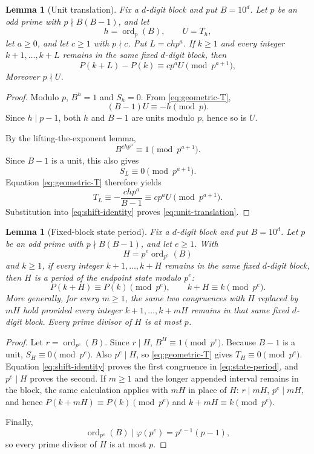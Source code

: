 \documentclass[11pt]{amsart}
\newtheorem{lemma}[theorem]{Lemma}
\theoremstyle{remark}
\newcommand{\ord}{\operatorname{ord}}
\begin{document}
\begin{lemma}[Unit translation]\label{lem:unit-translation}
Fix a \(d\)-digit block and put \(B=10^d\).  Let \(p\) be an odd prime with
\(p\nmid B(B-1)\), and let
\[
h=\ord_p(B),
\qquad
U=T_h,
\]
let \(a\ge0\), and let \(c\ge1\) with \(p\nmid c\).  Put \(L=chp^a\).  If
\(k\ge1\) and every integer \(k+1,\ldots,k+L\) remains in the same fixed
\(d\)-digit block, then
\begin{equation}\label{eq:unit-translation}
P(k+L)-P(k)\equiv cp^aU\pmod{p^{a+1}},
\end{equation}
Moreover \(p\nmid U\).
\end{lemma}

\begin{proof}
Modulo \(p\), \(B^h=1\) and \(S_h=0\).  From \eqref{eq:geometric-T},
\[
(B-1)U\equiv-h\pmod p.
\]
Since \(h\mid p-1\), both \(h\) and \(B-1\) are units modulo \(p\), hence so is \(U\).

By the lifting-the-exponent lemma,
\[
B^{chp^a}\equiv1\pmod{p^{a+1}}.
\]
Since \(B-1\) is a unit, this also gives
\[
S_L\equiv0\pmod{p^{a+1}}.
\]
Equation \eqref{eq:geometric-T} therefore yields
\[
T_L\equiv-\frac{chp^a}{B-1}\equiv cp^aU
\pmod{p^{a+1}}.
\]
Substitution into \eqref{eq:shift-identity} proves \eqref{eq:unit-translation}.
\end{proof}

\begin{lemma}[Fixed-block state period]\label{lem:state-period}
Fix a \(d\)-digit block and put \(B=10^d\).  Let \(p\) be an odd prime with
\(p\nmid B(B-1)\), and let \(e\ge1\).  With
\begin{equation}\label{eq:state-period-length}
H=p^e\ord_{p^e}(B)
\end{equation}
and \(k\ge1\), if every integer \(k+1,\ldots,k+H\) remains in the same fixed
\(d\)-digit block, then \(H\) is a period of the endpoint state modulo \(p^e\):
\begin{equation}\label{eq:state-period}
P(k+H)\equiv P(k)\pmod{p^e},
\qquad
k+H\equiv k\pmod{p^e}.
\end{equation}
More generally, for every \(m\ge1\), the same two congruences with \(H\) replaced
by \(mH\) hold provided every integer \(k+1,\ldots,k+mH\) remains in that same
fixed \(d\)-digit block.  Every prime divisor of \(H\) is at most \(p\).
\end{lemma}

\begin{proof}
Let \(r=\ord_{p^e}(B)\).  Since \(r\mid H\), \(B^H\equiv1\pmod{p^e}\).  Because
\(B-1\) is a unit, \(S_H\equiv0\pmod{p^e}\).  Also \(p^e\mid H\), so
\eqref{eq:geometric-T} gives \(T_H\equiv0\pmod{p^e}\).  Equation
\eqref{eq:shift-identity} proves the first congruence in
\eqref{eq:state-period}, and \(p^e\mid H\) proves the second.  If \(m\ge1\) and
the longer appended interval remains in the block, the same calculation applies with
\(mH\) in place of \(H\): \(r\mid mH\), \(p^e\mid mH\), and hence
\(P(k+mH)\equiv P(k)\pmod{p^e}\) and \(k+mH\equiv k\pmod{p^e}\).

Finally,
\[
\ord_{p^e}(B)\mid\varphi(p^e)=p^{e-1}(p-1),
\]
so every prime divisor of \(H\) is at most \(p\).
\end{proof}
\end{document}
